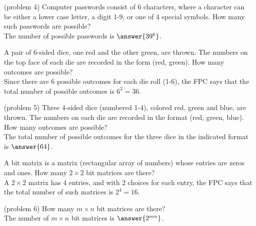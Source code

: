 \documentclass[handout]{ximera}
\begin{document}
\begin{problem}(problem 4)
Computer passwords consist of 6 characters, where a character can be either a lower case letter, 
a digit 1-9, or one of 4 special symbols.  How many such passwords are possible?\\
The number of possible passwords is $\answer{39^6}$.
\end{problem} 

\begin{example}[example 5]
A pair of 6-sided dice, one red and the other green, are thrown. The numbers on the top face of each die are recorded
in the form (red, green). How many outcomes are possible?\\
Since there are 6 possible outcomes for each die roll (1-6), the FPC says that the total number of possible outcomes is $6^2 = 36$.
\end{example}

\begin{problem}(problem 5)
Three 4-sided dice (numbered 1-4), colored red, green and blue, are thrown. 
The numbers on each die are recorded in the format 
(red, green, blue).  How many outcomes are possible?\\
The total number of possible outcomes for the three dice in the indicated format is $\answer{64}$.
\end{problem} 


\begin{example}[example 6]
A bit matrix is a matrix (rectangular array of numbers) whose entries are zeros and ones. How many $2 \times 2$ bit matrices are there?\\
A $2\times 2$ matrix has 4 entries, and with 2 choices for each entry, the FPC says that the total number of such matrices is $2^4 = 16$.
\end{example}

\begin{problem}(problem 6)
How many $m \times n$ bit matrices are there?\\
The number of $m \times n$ bit matrices is $\answer{2^{mn}}$.
\end{problem}
\end{document}
